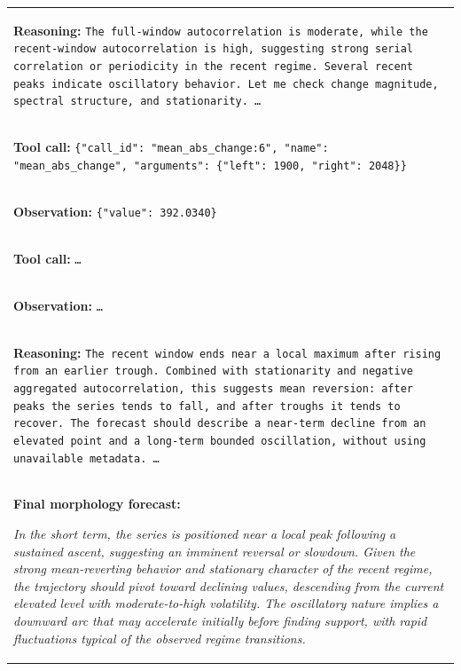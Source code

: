 \documentclass[11pt]{article}
\begin{document}
\begin{table}[t]
\begin{tabular}{p{}}
\colorbox{green!10}{\parbox{0.95\textwidth}{%
\textbf{Reasoning:}
\texttt{The full-window autocorrelation is moderate, while the recent-window
autocorrelation is high, suggesting strong serial correlation or periodicity in
the recent regime. Several recent peaks indicate oscillatory behavior. Let me
check change magnitude, spectral structure, and stationarity. \ldots}
}} \\

\hdashline

\colorbox{red!10}{\parbox{0.95\textwidth}{%
\textbf{Tool call:}
\texttt{\{"call\_id": "mean\_abs\_change:6", "name": "mean\_abs\_change",
"arguments": \{"left": 1900, "right": 2048\}\}}
}} \\

\colorbox{blue!10}{\parbox{0.95\textwidth}{%
\textbf{Observation:}
\texttt{\{"value": 392.0340\}}
}} \\

\hdashline

\colorbox{red!10}{\parbox{0.95\textwidth}{%
\textbf{Tool call:}
\texttt{\ldots}
}} \\

\colorbox{blue!10}{\parbox{0.95\textwidth}{%
\textbf{Observation:}
\texttt{\ldots}
}} \\

\hdashline

\colorbox{green!10}{\parbox{0.95\textwidth}{%
\textbf{Reasoning:}
\texttt{The recent window ends near a local maximum after rising from an
earlier trough. Combined with stationarity and negative aggregated
autocorrelation, this suggests mean reversion: after peaks the series tends to
fall, and after troughs it tends to recover. The forecast should describe a
near-term decline from an elevated point and a long-term bounded oscillation,
without using unavailable metadata. \ldots}
}} \\

\hdashline

\colorbox{gray!10}{\parbox{0.95\textwidth}{%
\textbf{Final morphology forecast:}

\textit{In the short term, the series is positioned near a local peak following
a sustained ascent, suggesting an imminent reversal or slowdown. Given the
strong mean-reverting behavior and stationary character of the recent regime,
the trajectory should pivot toward declining values, descending from the
current elevated level with moderate-to-high volatility. The oscillatory nature
implies a downward arc that may accelerate initially before finding support,
with rapid fluctuations typical of the observed regime transitions.}

}}
\end{tabular}
\end{table}
\end{document}
